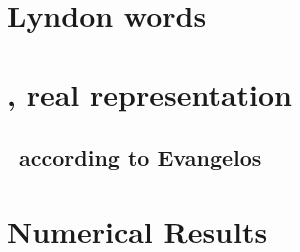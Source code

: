 \chapter{Lyndon words}


\chapter{\KS, real representation}

\section{\KSe\ according to Evangelos}


\chapter{Numerical Results}


\begin{postliminary}
\gtindex
    \ifpaper               %
\begin{vita}
    
\end{vita}
    \fi
\end{postliminary}


